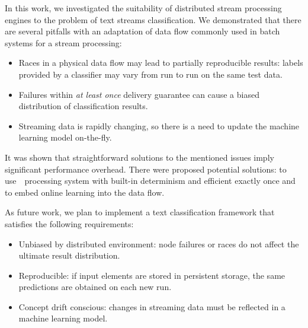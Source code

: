 \label {fs-conclusion}

In this work, we investigated the suitability of distributed stream processing engines to the problem of text streams classification. We demonstrated that there are several pitfalls with an adaptation of data flow commonly used in batch systems for a stream processing:

\begin{itemize}
    \item Races in a physical data flow may lead to partially reproducible results: labels provided by a classifier may vary from run to run on the same test data. 
    \item Failures within {\em at least once} delivery guarantee can cause a biased distribution of classification results.
    \item Streaming data is rapidly changing, so there is a need to update the machine learning model on-the-fly. 
\end{itemize}

It was shown that straightforward solutions to the mentioned issues imply significant performance overhead. There were proposed potential solutions: to use~\FlameStream\ processing system with built-in determinism and efficient exactly once and to embed online learning into the data flow. 

As future work, we plan to implement a text classification framework that satisfies the following requirements:

\begin{itemize}
    \item Unbiased by distributed environment: node failures or races do not affect the ultimate result distribution.
    \item Reproducible: if input elements are stored in persistent storage, the same predictions are obtained on each new run.
    \item Concept drift conscious: changes in streaming data must be reflected in a machine learning model.  
\end{itemize}